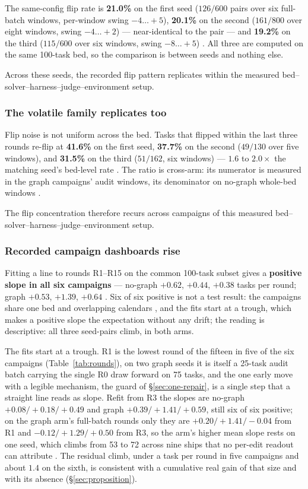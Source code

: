 The same-config flip rate is \textbf{21.0\%} on the first seed
($126/600$ pairs over six full-batch windows, per-window swing
$-4\ldots{+}5$), \textbf{20.1\%} on the second ($161/800$ over eight
windows, swing $-4\ldots{+}2$) --- near-identical to the pair --- and
\textbf{19.2\%} on the third ($115/600$ over six windows, swing
$-8\ldots{+}5$) . All three are computed on the same 100-task bed,
so the comparison is between seeds and nothing else.

Across these seeds, the recorded flip pattern replicates within the measured
bed--solver--harness--judge--environment setup.

\subsubsection*{The volatile family replicates too}

Flip noise is not uniform across the bed. Tasks that flipped within the
last three rounds re-flip at \textbf{41.6\%} on the first seed,
\textbf{37.7\%} on the second ($49/130$ over five windows), and
\textbf{31.5\%} on the third ($51/162$, six windows) --- $1.6$ to
$2.0\times$ the matching seed's bed-level rate . The ratio is cross-arm:
its numerator is measured in the graph campaigns' audit windows, its
denominator on no-graph whole-bed windows .

The flip concentration therefore recurs across campaigns of this measured
bed--solver--harness--judge--environment setup.

\subsubsection*{Recorded campaign dashboards rise}
\label{sec:trend}

Fitting a line to rounds R1--R15 on the common 100-task subset gives a
\textbf{positive slope in all six campaigns} --- no-graph $+0.62$, $+0.44$,
$+0.38$ tasks per round; graph $+0.53$, $+1.39$, $+0.64$ . Six of six
positive is not a test result: the campaigns share one bed and overlapping
calendars , and the fits start at a trough, which makes a positive
slope the expectation without any drift; the reading is descriptive: all
three seed-pairs climb, in both arms.

The fits start at a trough. R1 is the lowest round of the fifteen in five
of the six campaigns (Table~\ref{tab:rounds}), on two graph seeds it is
itself a 25-task audit batch carrying the single R0 draw forward on 75
tasks, and the one early move with a legible mechanism, the guard of
\S\ref{sec:one-repair}, is a single step that a straight line reads as
slope. Refit from R3 the slopes are no-graph $+0.08/+0.18/+0.49$ and graph
$+0.39/+1.41/+0.59$, still six of six positive; on the graph arm's
full-batch rounds only they are $+0.20/+1.41/-0.04$ from R1 and
$-0.12/+1.29/+0.50$ from R3, so the arm's higher mean slope rests on one
seed, which climbs from 53 to 72 across nine ships that no per-edit
readout can attribute . The residual climb, under a task per round in five campaigns and about $1.4$ on the sixth, is
consistent with a cumulative real gain of that size and with its absence
(\S\ref{sec:proposition}).

